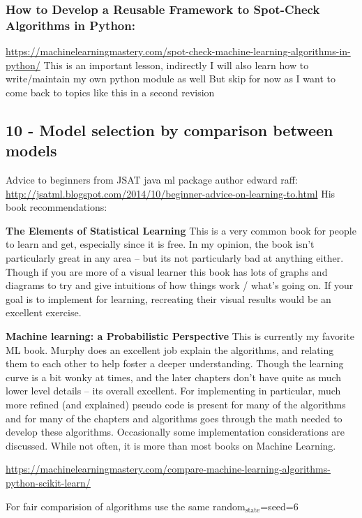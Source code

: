 \documentclass[11pt]{article}
\begin{document}
\subsubsection{How to Develop a Reusable Framework to Spot-Check Algorithms in Python:}
\label{sec:orgb1dafa1}
\url{https://machinelearningmastery.com/spot-check-machine-learning-algorithms-in-python/}
This is an important lesson, indirectly I will also learn how to write/maintain my own python module as well
But skip for now as I want to come back to topics like this in a second revision




\subsection{10 - Model selection by comparison between models}
\label{sec:orgc91bd55}
Advice to beginners from JSAT java ml package author edward raff:
\url{http://jsatml.blogspot.com/2014/10/beginner-advice-on-learning-to.html}
His book recommendations: 

\textbf{The Elements of Statistical Learning}
This is a very common book for people to learn and get, especially
since it is free. In my opinion, the book isn't particularly great in
any area – but its not particularly bad at anything either. Though if
you are more of a visual learner this book has lots of graphs and
diagrams to try and give intuitions of how things work / what's going
on. If your goal is to implement for learning, recreating their
visual results would be an excellent exercise.

\textbf{Machine learning: a Probabilistic Perspective}
This is currently my favorite ML book. Murphy does an excellent job
explain the algorithms, and relating them to each other to help foster
a deeper understanding. Though the learning curve is a bit wonky at
times, and the later chapters don’t have quite as much lower level
details – its overall excellent. For implementing in particular, much
more refined (and explained) pseudo code is present for many of the
algorithms and for many of the chapters and algorithms goes through
the math needed to develop these algorithms. Occasionally some
implementation considerations are discussed. While not often, it is
more than most books on Machine Learning.

\url{https://machinelearningmastery.com/compare-machine-learning-algorithms-python-scikit-learn/}

For fair comparision of algorithms use the same random\(_{\text{state}}\)=seed=6
\end{document}
